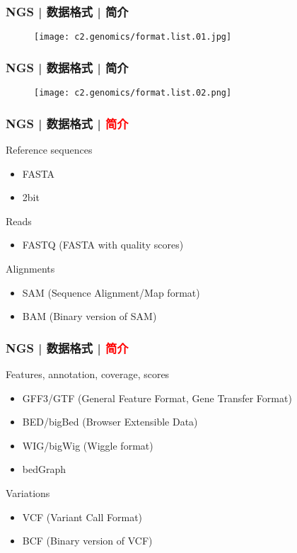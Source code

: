 \begin{frame}
  \frametitle{NGS | 数据格式 | 简介}
  \begin{figure}
    \centering
    \texttt{[image: c2.genomics/format.list.01.jpg]}
  \end{figure}
\end{frame}

\begin{frame}
  \frametitle{NGS | 数据格式 | 简介}
  \begin{figure}
    \centering
    \texttt{[image: c2.genomics/format.list.02.png]}
  \end{figure}
\end{frame}

\begin{frame}
  \frametitle{NGS | 数据格式 | \textcolor{red}{简介}}
  \begin{block}{Reference sequences}
    \begin{itemize}
      \item FASTA
      \item 2bit
    \end{itemize}
  \end{block}
  \pause
  \begin{block}{Reads}
    \begin{itemize}
      \item FASTQ (FASTA with quality scores)
    \end{itemize}
  \end{block}
  \pause
  \begin{block}{Alignments}
    \begin{itemize}
      \item SAM (Sequence Alignment/Map format)
      \item BAM (Binary version of SAM)
    \end{itemize}
  \end{block}
\end{frame}

\begin{frame}
  \frametitle{NGS | 数据格式 | \textcolor{red}{简介}}
  \begin{block}{Features, annotation, coverage, scores}
    \begin{itemize}
      \item GFF3/GTF (General Feature Format, Gene Transfer Format)
      \item BED/bigBed (Browser Extensible Data)
      \item WIG/bigWig (Wiggle format)
      \item bedGraph
    \end{itemize}
  \end{block}
  \pause
  \begin{block}{Variations}
    \begin{itemize}
      \item VCF (Variant Call Format)
      \item BCF (Binary version of VCF)
    \end{itemize}
  \end{block}
\end{frame}

